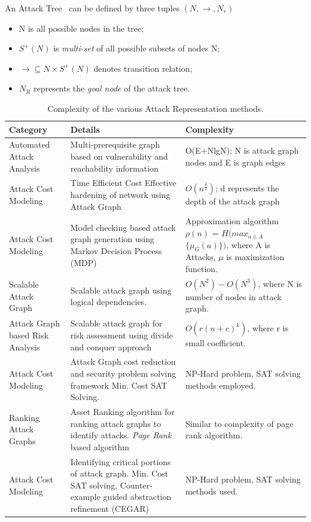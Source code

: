 \begin{definition}
An Attack Tree~ can be defined by three tuples $(N, \rightarrow, N_r)$
\begin{itemize}
    \item N is all possible nodes in the tree;
    \item $S^+(N)$ is \emph{multi-set} of all possible subsets of nodes N;
    \item $\rightarrow \subseteq N \times S^+(N)$ denotes transition relation;
    \item $N_R$ represents the \emph{goal node} of the attack tree.
\end{itemize}    
\end{definition}
\begin{table}[t]
    \centering
    \setlength{\extrarowheight}{3pt}
    \begin{tabular}{|p{40mm}|p{60mm}|p{60mm}|}
        \hline
        \textbf{Category} & \textbf{Details} & \textbf{Complexity}\\
        \hline
        Automated Attack Analysis ~ & Multi-prerequisite graph based on vulnerability and reachability information & O(E+NlgN); N is attack graph nodes and E is graph edges \\
        \hline
        Attack Cost Modeling~ &
        Time Efficient Cost Effective hardening of network using Attack Graph &  $O(n^{\frac{d}{2}})$; d represents the depth of the attack graph \\
        \hline
        Attack Cost Modeling~ & Model checking based attack graph generation using Markov Decision Process (MDP) &  Approximation algorithm $\rho(n)$ = $H(max_{a \in A}$
        $\{\mu_G(a)\})$, where A is Attacks, $\mu$ is maximization function.\\
        \hline
        Scalable Attack Graph~ & Scalable attack graph using logical dependencies. & $O(N^2) - O(N^3)$, where N is number of nodes in attack graph. \\
        \hline
        Attack Graph based Risk Analysis~ & Scalable attack graph for risk assessment using divide and conquer approach &  $O(r(n+c)^k)$, where r is small coefficient. \\
        \hline
        Attack Cost Modeling~ & Attack Graph cost reduction and security problem solving framework Min. Cost SAT Solving. & NP-Hard problem, SAT solving methods employed. \\
        \hline
        Ranking Attack Graphs~ & Asset Ranking algorithm for ranking attack graphs to identify attacks. \emph{Page Rank} based algorithm & Similar to complexity of page rank algorithm. \\
        \hline
        Attack Cost Modeling~ & Identifying critical portions of attack graph. Min. Cost SAT solving, Counter-example guided abstraction refinement (CEGAR) & NP-Hard problem, SAT solving methods used. \\
        \hline
    \end{tabular}
    \caption{Complexity of the various Attack Representation methods.}
    \label{tab:4}
\end{table}
